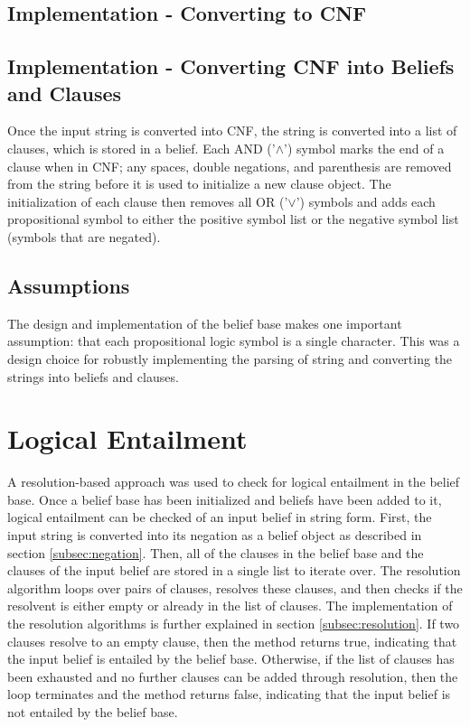 \documentclass[a4paper,10pt]{article}
\begin{document}
\subsection{Implementation - Converting to CNF}
\label{subsec:implementation_cnf}

\subsection{Implementation - Converting CNF into Beliefs and Clauses}
\label{subsec:implementation}
Once the input string is converted into CNF, the string is converted into a list of clauses, which is stored in a belief. Each AND ('$\wedge$') symbol marks the end of
a clause when in CNF; any spaces, double negations, and parenthesis are removed from the string before it is used to initialize a new clause object. The
initialization of each clause then removes all OR ('$\vee$') symbols and adds each propositional symbol to either the positive symbol list or the negative symbol list
(symbols that are negated).

\subsection{Assumptions}
\label{subsec:assumptions}
The design and implementation of the belief base makes one important assumption: that each propositional logic symbol is a single character. This was a
design choice for robustly implementing the parsing of string and converting the strings into beliefs and clauses.

\section{Logical Entailment}
\label{sec:entail}
A resolution-based approach was used to check for logical entailment in the belief base. Once a belief base has been initialized and beliefs have been added
to it, logical entailment can be checked of an input belief in string form. First, the input string is converted into its negation as a belief object as described
in section \ref{subsec:negation}. Then, all of the clauses in the belief base and the clauses of the input belief are stored in a single list to iterate over. The
resolution algorithm loops over pairs of clauses, resolves these clauses, and then checks if the resolvent is either empty or already in the list of clauses.
The implementation of the resolution algorithms is further explained in section \ref{subsec:resolution}. If two clauses resolve to an empty clause,
then the method returns true, indicating that the input belief is entailed by the belief base. Otherwise, if the list of clauses has been exhausted and no further
clauses can be added through resolution, then the loop terminates and the method returns false, indicating that the input belief is not entailed by the belief
base. \\
\end{document}
